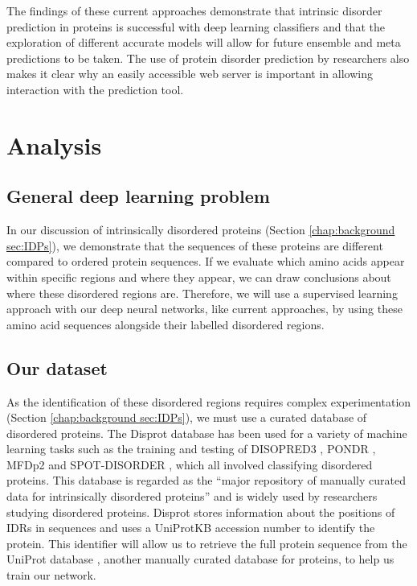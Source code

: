 \documentclass{l4proj}
\begin{document}
The findings of these current approaches demonstrate that intrinsic disorder prediction in proteins is successful with deep learning classifiers and that the exploration of different accurate models will allow for future ensemble and meta predictions to be taken. The use of protein disorder prediction by researchers also makes it clear why an easily accessible web server is important in allowing interaction with the prediction tool.


\chapter{Analysis}
\label{chap:analysis}

\section{General deep learning problem}

In our discussion of intrinsically disordered proteins (Section \ref{chap:background sec:IDPs}), we demonstrate that the sequences of these proteins are different compared to ordered protein sequences. If we evaluate which amino acids appear within specific regions and where they appear, we can draw conclusions about where these disordered regions are. Therefore, we will use a supervised learning approach with our deep neural networks, like current approaches, by using these amino acid sequences alongside their labelled disordered regions.  

\section{Our dataset}

As the identification of these disordered regions requires complex experimentation (Section \ref{chap:background sec:IDPs}), we must use a curated database of disordered proteins. The Disprot database \citep{disprot} has been used for a variety of machine learning tasks such as the training and testing of DISOPRED3 \citep{Jones:15}, PONDR \citep{Xue:10}, MFDp2 \citep{Mizianty:13} and SPOT-DISORDER \citep{Hanson:16}, which all involved classifying disordered proteins. This database is regarded as the “major repository of manually curated data for intrinsically disordered proteins” \citep{Quaglia:22} and is widely used by researchers studying disordered proteins. Disprot stores information about the positions of IDRs in sequences and uses a UniProtKB accession number to identify the protein. This identifier will allow us to retrieve the full protein sequence from the UniProt database \citep{uniprot:22}, another manually curated database for proteins, to help us train our network. 
\end{document}
